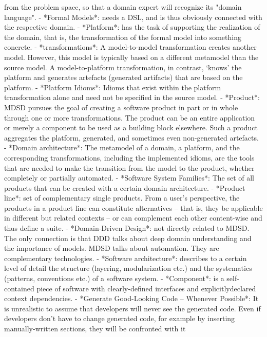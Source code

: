 \documentclass{book}
\begin{document}
  from the problem space, so that a domain expert will recognize its
  "domain language".
- *Formal Models*: needs a DSL, and is thus obviously connected with
  the respective domain.
- *Platform*: has the task of supporting the realization of the
  domain, that is, the transformation of the formal model into
  something concrete.
- *transformations*: A model-to-model transformation creates another
  model. However, this model is typically based on a different
  metamodel than the source model. A model-to-platform transformation,
  in contrast, ‘knows’ the platform and generates artefacts (generated
  artifacts) that are based on the platform.
- *Platform Idioms*: Idioms that exist within the platform
  transformation alone and need not be specified in the source model.
- *Product*: MDSD pursues the goal of creating a software product in
  part or in whole through one or more transformations. The product
  can be an entire application or merely a component to be used as a
  building block elsewhere. Such a product aggregates the platform,
  generated, and sometimes even non-generated artefacts.
- *Domain architecture*: The metamodel of a domain, a platform, and
  the corresponding transformations, including the implemented idioms,
  are the tools that are needed to make the transition from the model
  to the product, whether completely or partially automated.
- *Software System Families*: The set of all products that can be
  created with a certain domain architecture.
- *Product line*: set of complementary single products. From a user’s
  perspective, the products in a product line can constitute
  alternatives – that is, they be applicable in different but related
  contexts – or can complement each other content-wise and thus define
  a suite.
- *Domain-Driven Design*: not directly related to MDSD. The only
  connection is that DDD talks about deep domain understanding and the
  importance of models. MDSD talks about automation. They are
  complementary technologies.
- *Software architecture*: describes to a certain level of detail the
  structure (layering, modularization etc.) and the systematics
  (patterns, conventions etc.) of a software system.
- *Component*: is a self-contained piece of software with
  clearly-defined interfaces and explicitlydeclared context
  dependencies.
- *Generate Good-Looking Code – Whenever Possible*: It is unrealistic
  to assume that developers will never see the generated code. Even if
  developers don’t have to change generated code, for example by
  inserting manually-written sections, they will be confronted with it
\end{document}
